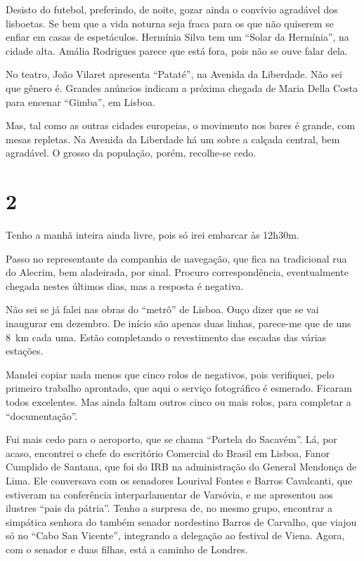Desisto do futebol, preferindo, de noite, gozar ainda o convívio agradável dos lisboetas. Se bem que a vida noturna seja fraca para os que não quiserem se enfiar em casas de espetáculos. Hermínia Silva tem um ``Solar da Hermínia'', na cidade alta. Amália Rodrigues parece que está fora, pois não se ouve falar dela.

No teatro, João Vilaret apresenta ``Pataté'', na Avenida da Liberdade. Não sei que gênero é. Grandes anúncios indicam a próxima chegada de Maria Della Costa para encenar ``Gimba'', em Lisboa.

Mas, tal como as outras cidades europeias, o movimento nos bares é grande, com mesas repletas. Na Avenida da Liberdade há um sobre a calçada central, bem agradável. O grosso da população, porém, recolhe-se cedo.

\section*{2 \adfflatleafright {}}
Tenho a manhã inteira ainda livre, pois só irei embarcar às 12h30m.

Passo no representante da companhia de navegação, que fica na tradicional rua do Alecrim, bem aladeirada, por sinal. Procuro correspondência, eventualmente chegada nestes últimos dias, mas a resposta é negativa.

Não sei se já falei nas obras do ``metrô'' de Lisboa. Ouço dizer que se vai inaugurar em dezembro. De início são apenas duas linhas, parece-me que de uns 8~km cada uma. Estão completando o revestimento das escadas das várias estações.

Mandei copiar nada menos que cinco rolos de negativos, pois verifiquei, pelo primeiro trabalho aprontado, que aqui o serviço fotográfico é esmerado. Ficaram todos excelentes. Mas ainda faltam outros cinco ou mais rolos, para completar a ``documentação''.

Fui mais cedo para o aeroporto, que se chama ``Portela do Sacavém''. Lá, por acaso, encontrei o chefe do escritório Comercial do Brasil em Lisboa, Fanor Cumplido de Santana, que foi do IRB na administração do General Mendonça de Lima. Ele conversava com os senadores Lourival Fontes e Barros Cavalcanti, que estiveram na conferência interparlamentar de Varsóvia, e me apresentou aos ilustres ``pais da pátria''. Tenho a surpresa de, no mesmo grupo, encontrar a simpática senhora do também senador nordestino Barros de Carvalho, que viajou só no ``Cabo San Vicente'', integrando a delegação ao festival de Viena. Agora, com o senador e duas filhas, está a caminho de Londres.

